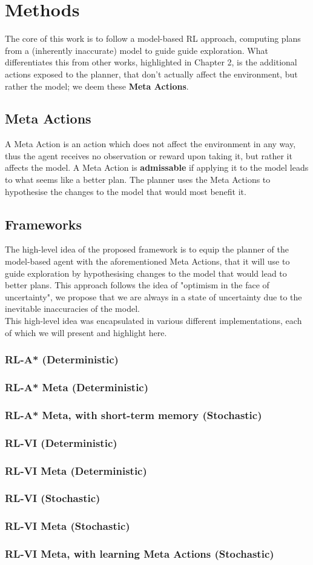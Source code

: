 \chapter{Methods}
\label{chapter4}
The core of this work is to follow a model-based RL approach, computing plans from a (inherently inaccurate) model to guide guide exploration. What differentiates this from other works, highlighted in Chapter 2, is the additional actions exposed to the planner, that don't actually affect the environment, but rather the model; we deem these \textbf{Meta Actions}.

\section{Meta Actions}
A Meta Action is an action which does not affect the environment in any way, thus the agent receives no observation or reward upon taking it, but rather it affects the model. A Meta Action is \textbf{admissable} if applying it to the model leads to what seems like a better plan. The planner uses the Meta Actions to hypothesise the changes to the model that would most benefit it.

\section{Frameworks}
The high-level idea of the proposed framework is to equip the planner of the model-based agent with the aforementioned Meta Actions, that it will use to guide exploration by hypothesising changes to the model that would lead to better plans. This approach follows the idea of "optimism in the face of uncertainty", we propose that we are always in a state of uncertainty due to the inevitable inaccuracies of the model.
\\This high-level idea was encapsulated in various different implementations, each of which we will present and highlight here.
\subsection{RL-A* (Deterministic)}
\subsection{RL-A* Meta (Deterministic)}
\subsection{RL-A* Meta, with short-term memory (Stochastic)}
\subsection{RL-VI (Deterministic)}
\subsection{RL-VI Meta (Deterministic)}
\subsection{RL-VI (Stochastic)}
\subsection{RL-VI Meta (Stochastic)}
\subsection{RL-VI Meta, with learning Meta Actions (Stochastic)}